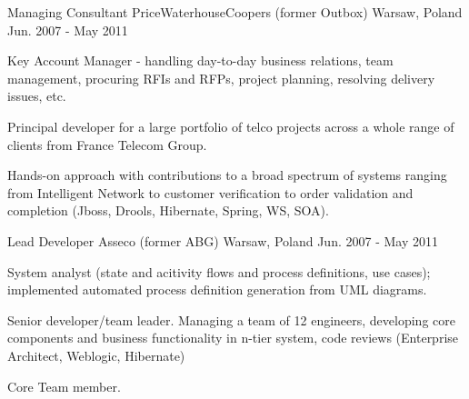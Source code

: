 \begin{cventries}
  \cventry
    {Managing Consultant} %
    {PriceWaterhouseCoopers (former Outbox)} %
    {Warsaw, Poland} %
    {Jun. 2007 - May 2011} %
    {
      \begin{cvitems} %
        \item {Key Account Manager - handling day-to-day business relations, team management, procuring RFIs and RFPs, project planning, resolving delivery issues, etc.}
        \item {Principal developer for a large portfolio of telco projects across a whole range of clients from France Telecom Group.}
        \item {Hands-on approach with contributions to a broad spectrum of systems ranging from Intelligent Network to customer verification to order validation and completion (Jboss, Drools, Hibernate, Spring, WS, SOA).}
      \end{cvitems}
    }

  \cventry
    {Lead Developer} %
    {Asseco (former ABG)} %
    {Warsaw, Poland} %
    {Jun. 2007 - May 2011} %
    {
      \begin{cvitems} %
        \item {System analyst (state and acitivity flows and process definitions, use cases); implemented automated process definition generation from UML diagrams.}
        \item {Senior developer/team leader. Managing a team of 12 engineers, developing core components and business functionality in n-tier system, code reviews (Enterprise Architect, Weblogic, Hibernate)}
        \item {Core Team member.}
      \end{cvitems}
    }

\end{cventries}
